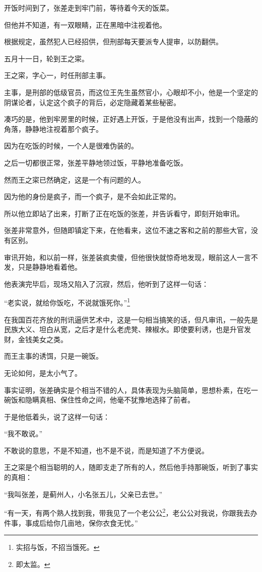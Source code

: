 \begin{multicols}{\theparacolNo}
开饭时间到了，张差走到牢门前，等待着今天的饭菜。

但他并不知道，有一双眼睛，正在黑暗中注视着他。

根据规定，虽然犯人已经招供，但刑部每天要派专人提审，以防翻供。

五月十一日，轮到王之寀。

王之寀，字心一，时任刑部主事。

主事，是刑部的低级官员，而这位王先生虽然官小，心眼却不小，他是一个坚定的阴谋论者，认定这个疯子的背后，必定隐藏着某些秘密。

凑巧的是，他到牢房里的时候，正好遇上开饭，于是他没有出声，找到一个隐蔽的角落，静静地注视着那个疯子。

因为在吃饭的时候，一个人是很难伪装的。

之后一切都很正常，张差平静地领过饭，平静地准备吃饭。

然而王之寀已然确定，这是一个有问题的人。

因为他的身份是疯子，而一个疯子，是不会如此正常的。

所以他立即站了出来，打断了正在吃饭的张差，并告诉看守，即刻开始审讯。

张差非常意外，但随即镇定下来，在他看来，这位不速之客和之前的那些大官，没有区别。

审讯开始，和以前一样，张差装疯卖傻，但他很快就惊奇地发现，眼前这人一言不发，只是静静地看着他。

他表演完毕后，现场又陷入了沉寂，然后，他听到了这样一句话：

“老实说，就给你饭吃，不说就饿死你。”\footnote{实招与饭，不招当饿死。}

在我国百花齐放的刑讯逼供艺术中，这是一句相当搞笑的话，但凡审讯，一般先是民族大义、坦白从宽，之后才是什么老虎凳、辣椒水。即使要利诱，也是升官发财，金钱美女之类。

而王主事的诱饵，只是一碗饭。

无论如何，是太小气了。

事实证明，张差确实是个相当不错的人，具体表现为头脑简单，思想朴素，在吃一碗饭和隐瞒真相、保住性命之间，他毫不犹豫地选择了前者。

于是他低着头，说了这样一句话：

“我不敢说。”

不敢说的意思，不是不知道，也不是不说，而是知道了不方便说。

王之寀是个相当聪明的人，随即支走了所有的人，然后他手持那碗饭，听到了事实的真相：

“我叫张差，是蓟州人，小名张五儿，父亲已去世。”

“有一天，有两个熟人找到我，带我见了一个老公公\footnote{即太监。}，老公公对我说，你跟我去办件事，事成后给你几亩地，保你衣食无忧。”


\end{multicols}
